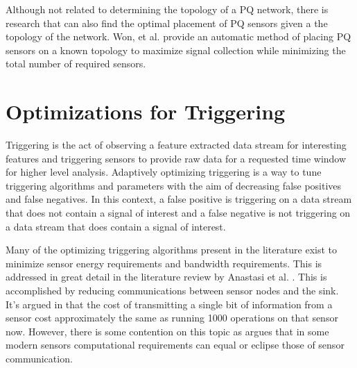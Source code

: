 Although not related to determining the topology of a PQ network, there is research that can also find the optimal placement of PQ sensors given a the topology of the network. Won, et al.\cite{won2008optimal} provide an automatic method of placing PQ sensors on a known topology to maximize signal collection while minimizing the total number of required sensors.

\section{Optimizations for Triggering}\label{sec:optimizations-for-triggering}
Triggering is the act of observing a feature extracted data stream for interesting features and triggering sensors to provide raw data for a requested time window for higher level analysis. Adaptively optimizing triggering is a way to tune triggering algorithms and parameters with the aim of decreasing false positives and false negatives. In this context, a false positive is triggering on a data stream that does not contain a signal of interest and a false negative is not triggering on a data stream that does contain a signal of interest.

Many of the optimizing triggering algorithms present in the literature exist to minimize sensor energy requirements and bandwidth requirements. This is addressed in great detail in the literature review by Anastasi et al. \cite{anastasi_energy_2009}. This is accomplished by reducing communications between sensor nodes and the sink. It's argued in \cite{pottie2000wireless} that the cost of transmitting a single bit of information from a sensor cost approximately the same as running 1000 operations on that sensor now. However, there is some contention on this topic as \cite{alippi_adaptive_2010} argues that in some modern sensors computational requirements can equal or eclipse those of  sensor communication.

